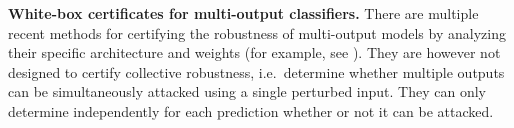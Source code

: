 \documentclass{article} %
\theoremstyle{plain}
\theoremstyle{definition}
\theoremstyle{remark}
\begin{document}

\textbf{White-box certificates for multi-output classifiers.} There are multiple recent methods for certifying the robustness of multi-output models by analyzing their specific architecture and weights (for example, see \citep{Tran2021, Zuegner2019, Bojchevski2019, Zuegner2020, Ko2019, Ryou2021, Shi2020,Bonaert2021}). They are however not designed to certify collective robustness, i.e.\ determine whether multiple outputs can be simultaneously attacked using a single perturbed input.
They can only determine independently for each prediction whether or not it can be attacked.
\end{document}
